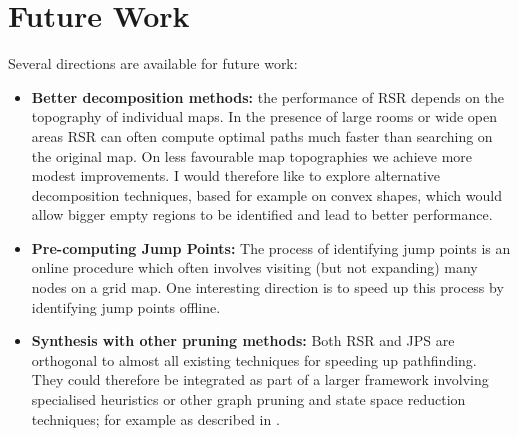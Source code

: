 \section{Future Work}
\label{sec:futurework}
Several directions are available for future work:
\begin{itemize}
\item{\textbf{Better decomposition methods:} the performance of RSR depends on the 
topography of individual maps. In the presence of large rooms or wide open 
areas RSR can often compute optimal paths much faster than searching on the original
map. On less favourable map topographies we achieve more modest improvements.
I would therefore like to explore alternative decomposition techniques, based
for example on convex shapes, which would allow bigger empty regions to be
identified and lead to better performance.}
\item{\textbf{Pre-computing Jump Points: } The process of identifying jump points
is an online procedure which often involves visiting (but not expanding) many
nodes on a grid map. One interesting direction is to speed up this process by
identifying jump points offline. } 
\item{\textbf{Synthesis with other pruning methods:} Both RSR and JPS are 
orthogonal to almost
all existing techniques for speeding up pathfinding. 
They could therefore be
integrated as part of a larger framework involving specialised heuristics or
other graph pruning and state space reduction techniques; for example as
described in \cite{botea04,bjornsson06,pochter10}.}
\end{itemize}

